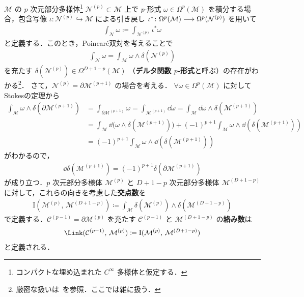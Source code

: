 \documentclass[TQFT_main]{subfiles}
\begin{document}
$\mathcal{M}$ の $p$ 次元部分多様体\footnote{コンパクトな埋め込まれた $C^\infty$ 多様体と仮定する．} $\mathcal{N}^{(p)} \subset \mathcal{M}$ 上で $p$-形式 $\omega \in \Omega^p(\mathcal{M})$ を積分する場合，包含写像 $\iota \colon \mathcal{N}^{(p)} \hookrightarrow \mathcal{M}$ による引き戻し $\iota^* \colon \Omega^p(\mathcal{M}) \longrightarrow \Omega^p(\mathcal{N}^{(p)})$ を用いて
\begin{align}
    \int_{\mathcal{N}} \omega \coloneqq \int_{\mathcal{N}^{(p)}} \iota^*\omega
\end{align}
と定義する．このとき，Poincar\'{e}双対を考えることで
\begin{align}
    \int_{\mathcal{N}} \omega = \int_{\mathcal{M}} \omega \wedge \delta(\mathcal{N}^{(p)})
\end{align}
を充たす $\delta(\mathcal{N}^{(p)}) \in \Omega^{D+1-p}(\mathcal{M})$ （\textbf{デルタ関数 $p$-形式}と呼ぶ）の存在がわかる\footnote{厳密な扱いは~\cite[p.270]{Nicolaescu2022lecture}を参照．ここでは雑に扱う．}．
さて，$\mathcal{N}^{(p)} = \partial \mathcal{M}^{(p+1)}$ の場合を考える．
$\forall \omega \in \Omega^p (\mathcal{M})$ に対してStokesの定理から
\begin{align}
    \int_{\mathcal{M}} \omega \wedge \delta(\partial \mathcal{M}^{(p+1)}) 
    &= \int_{\partial \mathcal{M}^{(p+1)}} \omega 
    = \int_{\mathcal{M}^{(p+1)}} \dd{\omega} 
    = \int_\mathcal{M} \dd{\omega} \wedge \delta(\mathcal{M}^{(p+1)}) \\
    &= \int_{\mathcal{M}} \dd \bigl( \omega \wedge \delta(\mathcal{M}^{(p+1)}) \bigr) + (-1)^{p+1} \int_{\mathcal{M}} \omega \wedge \dd(\delta(\mathcal{M}^{(p+1)})) \\
    &= (-1)^{p+1} \int_{\mathcal{M}} \omega \wedge \dd (\delta(\mathcal{M}^{(p+1)}))
\end{align}
がわかるので，
\begin{align}
    \label{eq:def-Intersection}
    \dd{\delta(\mathcal{M}^{(p+1)})} = (-1)^{p+1} \delta(\partial \mathcal{M}^{(p+1)})
\end{align}
が成り立つ．$p$ 次元部分多様体 $\mathcal{M}^{(p)}$ と $D+1-p$ 次元部分多様体 $\mathcal{M}^{(D+1-p)}$ に対して，これらの向きを考慮した\textbf{交点数}を
\begin{align}
    \mathrm{I} (\mathcal{M}^{(p)},\, \mathcal{M}^{(D+1-p)}) \coloneqq \int_{\mathcal{M}} \delta(\mathcal{M}^{(p)}) \wedge \delta(\mathcal{M}^{(D+1-p)})
\end{align}
で定義する．$\mathcal{C}^{(p-1)} = \partial\mathcal{M}^{(p)}$ を充たす $\mathcal{C}^{(p-1)}$ と $\mathcal{M}^{(D+1-p)}$ の\textbf{絡み数}は
\begin{align}
    \label{eq:def-Link}
    \Link (\mathcal{C}^{(p-1)},\, \mathcal{M}^{(p)}) \coloneqq \mathrm{I} (\mathcal{M}^{(p)},\, \mathcal{M}^{(D+1-p)})
\end{align}
と定義される．
\end{document}
